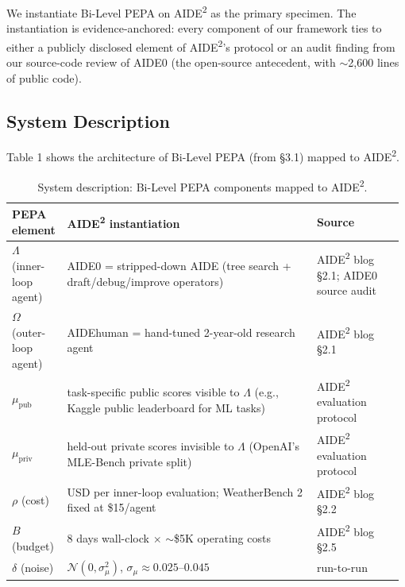 
We instantiate Bi-Level PEPA on AIDE\textsuperscript{2} \cite{weco2024aide} as the primary specimen. The instantiation is evidence-anchored: every component of our framework ties to either a publicly disclosed element of AIDE\textsuperscript{2}'s protocol or an audit finding from our source-code review of AIDE0 \cite{weco2024aide} (the open-source antecedent, with $\sim$2,600 lines of public code).

\subsection{System Description}

Table 1 shows the architecture of Bi-Level PEPA (from \S3.1) mapped to AIDE\textsuperscript{2}.

\begin{table}[h]
\centering
\caption{System description: Bi-Level PEPA components mapped to AIDE\textsuperscript{2}.}
\label{tab:system-description}
\small\setlength{\tabcolsep}{4pt}\begin{tabular}{@{}p{0.13\linewidth}p{0.63\linewidth}p{0.22\linewidth}@{}}
\toprule
PEPA element & AIDE\textsuperscript{2} instantiation & Source \\
\midrule
$\Lambda$ (inner-loop agent) & AIDE0 = stripped-down AIDE (tree search + draft/debug/improve operators) & AIDE\textsuperscript{2} blog \S2.1; AIDE0 source audit \\
$\Omega$ (outer-loop agent) & AIDEhuman = hand-tuned 2-year-old research agent & AIDE\textsuperscript{2} blog \S2.1 \\
$\mu_{\text{pub}}$ & task-specific public scores visible to $\Lambda$ (e.g., Kaggle public leaderboard for ML tasks) & AIDE\textsuperscript{2} evaluation protocol \\
$\mu_{\text{priv}}$ & held-out private scores invisible to $\Lambda$ (OpenAI's MLE-Bench private split) & AIDE\textsuperscript{2} evaluation protocol \\
$\rho$ (cost) & USD per inner-loop evaluation; WeatherBench 2 fixed at \$15/agent & AIDE\textsuperscript{2} blog \S2.2 \\
$B$ (budget) & 8 days wall-clock $\times$ $\sim$\$5K operating costs & AIDE\textsuperscript{2} blog \S2.5 \\
$\delta$ (noise) & $\mathcal{N}(0, \sigma^2_\mu)$, $\sigma_\mu \approx 0.025$--$0.045$ & run-to-run \\
\bottomrule
\end{tabular}
\end{table}

